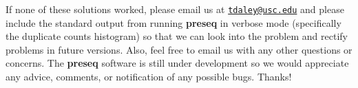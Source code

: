 \documentclass[11pt, titlepage]{article}
\newcounter{question}
\begin{document}
\vspace{5mm}
If none of these solutions worked, please email us at
\href{mailto:tdaley@usc.edu}{\nolinkurl{tdaley@usc.edu}}
and please include the standard output from running \textbf{preseq} in
verbose mode (specifically the duplicate counts histogram) so
that we can look into the problem and rectify problems in future
versions.  Also, feel free to email us with any other questions or
concerns.
The \textbf{preseq} software is still under development so we would appreciate any
advice, comments, or notification of any possible bugs. Thanks!

\newpage



\end{document}
